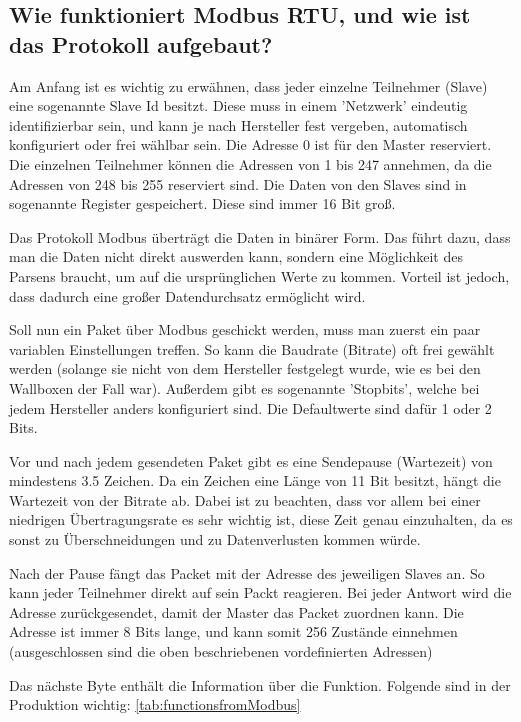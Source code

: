 \subsection{Wie funktioniert Modbus RTU, und wie ist das Protokoll aufgebaut?}
Am Anfang ist es wichtig zu erwähnen, dass jeder einzelne Teilnehmer (Slave) eine sogenannte Slave Id besitzt. Diese muss in einem 'Netzwerk' eindeutig identifizierbar sein, und kann je nach Hersteller fest vergeben, automatisch konfiguriert oder frei wählbar sein. Die Adresse 0 ist für den Master reserviert. Die einzelnen Teilnehmer können die Adressen von 1 bis 247 annehmen, da die Adressen von 248 bis 255 reserviert sind. Die Daten von den Slaves sind in sogenannte Register gespeichert. Diese sind immer 16 Bit groß.  

Das Protokoll Modbus überträgt die Daten in binärer Form. Das führt dazu, dass man die Daten nicht direkt auswerden kann, sondern eine Möglichkeit des Parsens braucht, um auf die ursprünglichen Werte zu kommen. Vorteil ist jedoch, dass dadurch eine großer Datendurchsatz ermöglicht wird. 

 

Soll nun ein Paket über Modbus geschickt werden, muss man zuerst ein paar variablen Einstellungen treffen. So kann die Baudrate (Bitrate) oft frei gewählt werden (solange sie nicht von dem Hersteller festgelegt wurde, wie es bei den Wallboxen der Fall war). Außerdem gibt es sogenannte 'Stopbits', welche bei jedem Hersteller anders konfiguriert sind. Die Defaultwerte sind dafür 1 oder 2 Bits. 

 

Vor und nach jedem gesendeten Paket gibt es eine Sendepause (Wartezeit) von mindestens 3.5 Zeichen. Da ein Zeichen eine Länge von 11 Bit besitzt, hängt die Wartezeit von der Bitrate ab. Dabei ist zu beachten, dass vor allem bei einer niedrigen Übertragungsrate es sehr wichtig ist, diese Zeit genau einzuhalten, da es sonst zu Überschneidungen und zu Datenverlusten kommen würde.  

Nach der Pause fängt das Packet mit der Adresse des jeweiligen Slaves an. So kann jeder Teilnehmer direkt auf sein Packt reagieren. Bei jeder Antwort wird die Adresse zurückgesendet, damit der Master das Packet zuordnen kann. Die Adresse ist immer 8 Bits lange, und kann somit 256 Zustände einnehmen (ausgeschlossen sind die oben beschriebenen vordefinierten Adressen) 

Das nächste Byte enthält die Information über die Funktion. Folgende sind in der Produktion wichtig: \ref{tab:functionsfromModbus}

